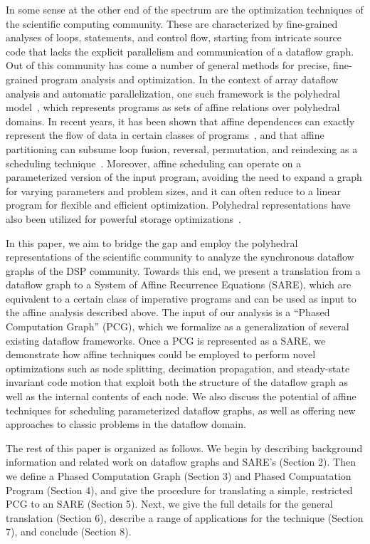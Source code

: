 In some sense at the other end of the spectrum are the optimization
techniques of the scientific computing community.  These are
characterized by fine-grained analyses of loops, statements, and
control flow, starting from intricate source code that lacks the
explicit parallelism and communication of a dataflow graph.  Out of
this community has come a number of general methods for precise,
fine-grained program analysis and optimization.  In the context of
array dataflow analysis and automatic parallelization, one such
framework is the polyhedral model~\cite{RV00}, which represents
programs as sets of affine relations over polyhedral domains. In
recent years, it has been shown that affine dependences can exactly
represent the flow of data in certain classes of
programs~\cite{Feautrier92i}, and that affine partitioning can subsume
loop fusion, reversal, permutation, and reindexing as a scheduling
technique~\cite{Lim98}.  Moreover, affine scheduling can operate on a
parameterized version of the input program, avoiding the need to
expand a graph for varying parameters and problem sizes, and it can
often reduce to a linear program for flexible and efficient
optimization.  Polyhedral representations have also been utilized for
powerful storage optimizations~\cite{Lim01,Quillere,Thies01,Lefebvre98}.

In this paper, we aim to bridge the gap and employ the polyhedral
representations of the scientific community to analyze the synchronous
dataflow graphs of the DSP community.  Towards this end, we present a
translation from a dataflow graph to a System of Affine Recurrence
Equations (SARE), which are equivalent to a certain class of
imperative programs and can be used as input to the affine analysis
described above.  The input of our analysis is a ``Phased Computation
Graph'' (PCG), which we formalize as a generalization of several
existing dataflow frameworks.  Once a PCG is represented as a SARE, we
demonstrate how affine techniques could be employed to perform novel
optimizations such as node splitting, decimation propagation, and
steady-state invariant code motion that exploit both the structure of
the dataflow graph as well as the internal contents of each node.  We
also discuss the potential of affine techniques for scheduling
parameterized dataflow graphs, as well as offering new approaches to
classic problems in the dataflow domain.

The rest of this paper is organized as follows.  We begin by
describing background information and related work on dataflow graphs
and SARE's (Section 2).  Then we define a Phased Computation Graph
(Section 3) and Phased Compuatation Program (Section 4), and give the
procedure for translating a simple, restricted PCG to an SARE (Section
5).  Next, we give the full details for the general translation
(Section 6), describe a range of applications for the technique
(Section 7), and conclude (Section 8).

